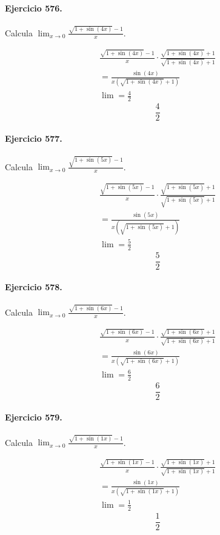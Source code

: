 \documentclass[11pt,a4paper]{article}
\begin{document}
\paragraph{Ejercicio 576.} Calcula $\displaystyle\lim_{x\to0}\frac{\sqrt{1+\sin(4x)}-1}{x}$.

\[
\begin{aligned}
\frac{\sqrt{1+\sin(4x)}-1}{x}\cdot \frac{\sqrt{1+\sin(4x)}+1}{\sqrt{1+\sin(4x)}+1}\\
=\frac{\sin(4x)}{x(\sqrt{1+\sin(4x)}+1)}\\
\lim=\frac{4}{2}
\end{aligned}
\]
\[\boxed{\frac{4}{2}}\]


\paragraph{Ejercicio 577.} Calcula $\displaystyle\lim_{x\to0}\frac{\sqrt{1+\sin(5x)}-1}{x}$.

\[
\begin{aligned}
\frac{\sqrt{1+\sin(5x)}-1}{x}\cdot \frac{\sqrt{1+\sin(5x)}+1}{\sqrt{1+\sin(5x)}+1}\\
=\frac{\sin(5x)}{x(\sqrt{1+\sin(5x)}+1)}\\
\lim=\frac{5}{2}
\end{aligned}
\]
\[\boxed{\frac{5}{2}}\]


\paragraph{Ejercicio 578.} Calcula $\displaystyle\lim_{x\to0}\frac{\sqrt{1+\sin(6x)}-1}{x}$.

\[
\begin{aligned}
\frac{\sqrt{1+\sin(6x)}-1}{x}\cdot \frac{\sqrt{1+\sin(6x)}+1}{\sqrt{1+\sin(6x)}+1}\\
=\frac{\sin(6x)}{x(\sqrt{1+\sin(6x)}+1)}\\
\lim=\frac{6}{2}
\end{aligned}
\]
\[\boxed{\frac{6}{2}}\]


\paragraph{Ejercicio 579.} Calcula $\displaystyle\lim_{x\to0}\frac{\sqrt{1+\sin(1x)}-1}{x}$.

\[
\begin{aligned}
\frac{\sqrt{1+\sin(1x)}-1}{x}\cdot \frac{\sqrt{1+\sin(1x)}+1}{\sqrt{1+\sin(1x)}+1}\\
=\frac{\sin(1x)}{x(\sqrt{1+\sin(1x)}+1)}\\
\lim=\frac{1}{2}
\end{aligned}
\]
\[\boxed{\frac{1}{2}}\]
\end{document}
